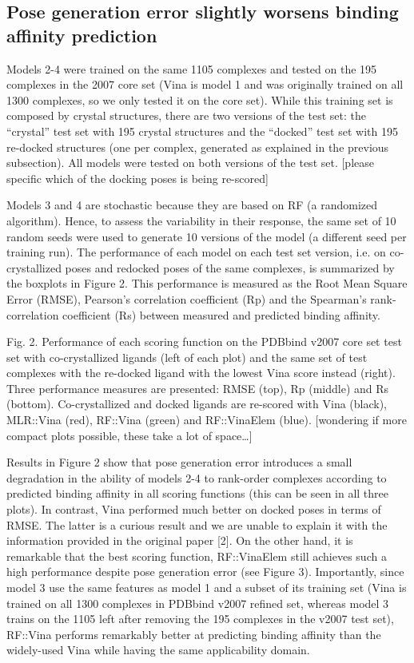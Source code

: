 \documentclass[twocolumn]{bmcart}
\begin{document}
\subsection*{Pose generation error slightly worsens binding affinity prediction}

Models 2-4 were trained on the same 1105 complexes and tested on the 195 complexes in the 2007 core set (Vina is model 1 and was originally trained on all 1300 complexes, so we only tested it on the core set). While this training set is composed by crystal structures, there are two versions of the test set: the “crystal” test set with 195 crystal structures and the “docked” test set with 195 re-docked structures (one per complex, generated as explained in the previous subsection). All models were tested on both versions of the test set. [please specific which of the docking poses is being re-scored]

Models 3 and 4 are stochastic because they are based on RF (a randomized algorithm). Hence, to assess the variability in their response, the same set of 10 random seeds were used to generate 10 versions of the model (a different seed per training run). The performance of each model on each test set version, i.e. on co-crystallized poses and redocked poses of the same complexes, is summarized by the boxplots in Figure 2. This performance is measured as the Root Mean Square Error (RMSE), Pearson’s correlation coefficient (Rp) and the Spearman’s rank-correlation coefficient (Rs) between measured and predicted binding affinity.

Fig. 2. Performance of each scoring function on the PDBbind v2007 core set test set with co-crystallized ligands (left of each plot) and the same set of test complexes with the re-docked ligand with the lowest Vina score instead (right). Three performance measures are presented: RMSE (top), Rp (middle) and Rs (bottom). Co-crystallized and docked ligands are re-scored with Vina (black), MLR::Vina (red), RF::Vina (green) and RF::VinaElem (blue). [wondering if more compact plots possible, these take a lot of space…]

Results in Figure 2 show that pose generation error introduces a small degradation in the ability of models 2-4 to rank-order complexes according to predicted binding affinity in all scoring functions (this can be seen in all three plots). In contrast, Vina performed much better on docked poses in terms of RMSE. The latter is a curious result and we are unable to explain it with the information provided in the original paper [2]. On the other hand, it is remarkable that the best scoring function, RF::VinaElem still achieves such a high performance despite pose generation error (see Figure 3). Importantly, since model 3 use the same features as model 1 and a subset of its training set (Vina is trained on all 1300 complexes in PDBbind v2007 refined set, whereas model 3 trains on the 1105 left after removing the 195 complexes in the v2007 test set), RF::Vina performs remarkably better at predicting binding affinity than the widely-used Vina while having the same applicability domain.
\end{document}

